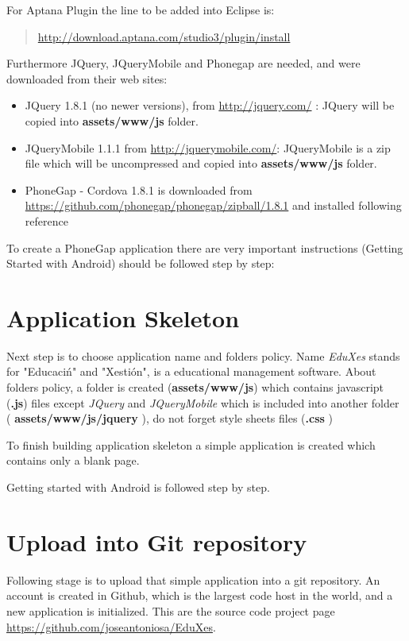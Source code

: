 	For Aptana Plugin the line to be added into Eclipse is: 
\begin{quote}
\url{http://download.aptana.com/studio3/plugin/install}    
\end{quote}

	Furthermore JQuery, JQueryMobile and Phonegap are needed, and were downloaded from their web sites:
	\begin{itemize}
	    \item {JQuery 1.8.1} (no newer versions), from \url{http://jquery.com/} :
	    \subitem JQuery will be  copied into {\bf assets/www/js} folder.
	    \item {JQueryMobile 1.1.1} from \url{ http://jquerymobile.com/}: 
        \subitem JQueryMobile is a zip file which will be uncompressed and copied into  {\bf assets/www/js} folder.
        \item{PhoneGap - Cordova 1.8.1} is downloaded from \url{https://github.com/phonegap/phonegap/zipball/1.8.1}
        and installed following reference \cite{PhoneGapGS} 

	\end{itemize}

	To create a PhoneGap application there are very important instructions (Getting Started with Android)  should be followed step by step:
\cite{AndroidGettingStarted}
\section{Application Skeleton}
  Next step is to choose application name and folders policy. Name \emph{EduXes} stands for "Educaci\'n" and "Xesti\'on", is a educational management software.
About folders policy, a folder is created ({\bf assets/www/js}) which contains javascript ({\bf *.js}) files except \emph{JQuery} and \emph{JQueryMobile} which is included into another
 folder ({ \bf assets/www/js/jquery} ), do not forget style sheets files ({\bf *.css } )
 
To finish building application skeleton a simple application is created which contains only a blank page.
 
Getting started with Android \cite{AndroidGettingStarted} is followed step by step.

\section{Upload into Git repository}

 Following stage is to upload that simple application into a git repository. 
An account is created in Github\cite{GitHub}, which is the largest code host in the world,  and a new application is initialized.  This are the source code project page \url{https://github.com/joseantoniosa/EduXes}.

